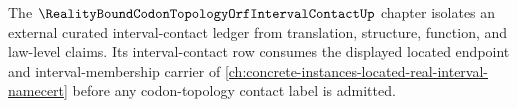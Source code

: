 The $\RealityBoundCodonTopologyOrfIntervalContactUp$ chapter isolates an external curated interval-contact ledger from translation, structure, function, and law-level claims. Its interval-contact row consumes the displayed located endpoint and interval-membership carrier of \autoref{ch:concrete-instances-located-real-interval-namecert} before any codon-topology contact label is admitted.
